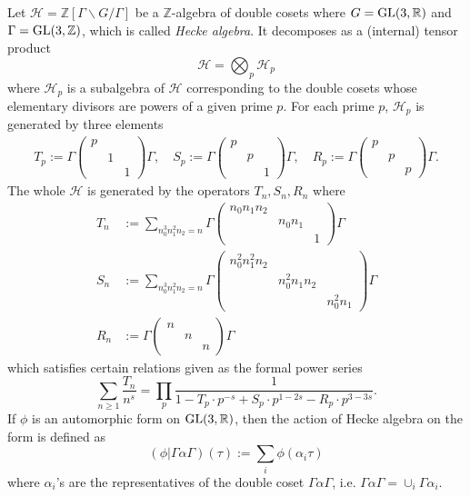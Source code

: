 \begin{definition}
Let $\mathcal{H} = \mathbb{Z}[\Gamma \backslash G / \Gamma]$ be a $\mathbb{Z}$-algebra of double cosets where $G = \operatorname{\mathrm{GL}}(3, \mathbb{R})$ and $\Gamma = \operatorname{\mathrm{GL}}(3, \mathbb{Z})$, which is called \emph{Hecke algebra}.
It decomposes as a (internal) tensor product
$$
\mathcal{H} = \bigotimes_{p} \mathcal{H}_{p}
$$
where $\mathcal{H}_{p}$ is a subalgebra of $\mathcal{H}$ corresponding to the double cosets whose elementary divisors are powers of a given prime $p$.
For each prime $p$, $\mathcal{H}_{p}$ is generated by three elements
\begin{align*}
    T_{p} := \Gamma \begin{pmatrix}
    p & & \\ & 1 & \\ & & 1
    \end{pmatrix} \Gamma, \quad
    S_{p} := \Gamma \begin{pmatrix}
    p & & \\ & p & \\ & & 1
    \end{pmatrix} \Gamma, \quad
    R_{p} := \Gamma \begin{pmatrix}
    p & & \\ & p & \\ & & p
    \end{pmatrix} \Gamma.
\end{align*}
The whole $\mathcal{H}$ is generated by the operators $T_{n}, S_{n}, R_{n}$ where 
\begin{align*}
    T_{n} &:= \sum_{n_{0}^{3} n_{1}^{2} n_{2} = n} \Gamma \begin{pmatrix}
    n_{0}n_{1}n_{2} & & \\ & n_{0}n_{1} & \\ & & 1
    \end{pmatrix} \Gamma \\
    S_{n} &:= \sum_{n_{0}^{3} n_{1}^{2} n_{2} = n} \Gamma \begin{pmatrix}
    n_{0}^{2}n_{1}^{2}n_{2} & & \\ & n_{0}^{2}n_{1}n_{2} & \\ & & n_{0}^{2}n_{1}
    \end{pmatrix} \Gamma \\
    R_{n} &:= \Gamma \begin{pmatrix}
    n & & \\ & n & \\ & & n
    \end{pmatrix} \Gamma
\end{align*}
which satisfies certain relations given as the formal power series
$$
\sum_{n \geq 1} \frac{T_{n}}{n^{s}} = \prod_{p} \frac{1}{1 - T_{p}\cdot p^{-s} +S_{p}\cdot p^{1-2s} - R_{p}\cdot p^{3-3s}}.
$$
If $\phi$ is an automorphic form on $\operatorname{\mathrm{GL}}(3, \mathbb{R})$, then the action of Hecke algebra on the form is defined as 
$$
(\phi | \Gamma \alpha \Gamma)(\tau) := \sum_{i} \phi(\alpha_{i} \tau)
$$
where $\alpha_{i}$'s are the representatives of the double coset $\Gamma \alpha \Gamma$, i.e. $\Gamma \alpha \Gamma = \cup_{i} \Gamma\alpha_{i}$.
\end{definition}
